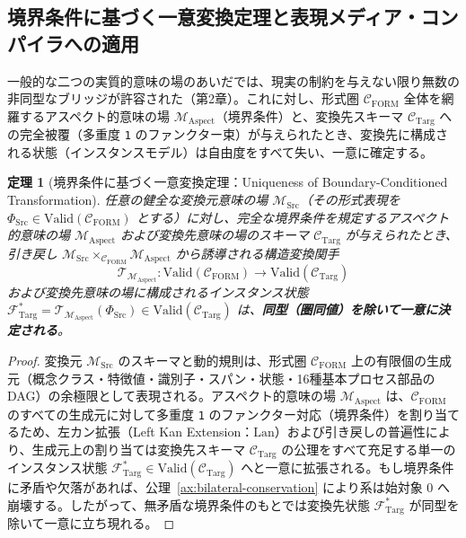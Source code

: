 \documentclass[11pt,a4paper]{ltjsarticle}
\theoremstyle{definition}
\theoremstyle{plain}
\newtheorem{theorem}{定理}[section]
\theoremstyle{remark}
\newcommand{\Valid}{\mathrm{Valid}}
\newcommand{\CFORM}{\mathcal{C}_{\mathrm{FORM}}}
\newcommand{\CTarg}{\mathcal{C}_{\mathrm{Targ}}}
\newcommand{\MSrc}{\mathcal{M}_{\mathrm{Src}}}
\newcommand{\MAspect}{\mathcal{M}_{\mathrm{Aspect}}}
\begin{document}
\subsection{境界条件に基づく一意変換定理と表現メディア・コンパイラへの適用}
一般的な二つの実質的意味の場のあいだでは、現実の制約を与えない限り無数の非同型なブリッジが許容された（第2章）。これに対し、形式圏 $\CFORM$ 全体を網羅するアスペクト的意味の場 $\MAspect$（境界条件）と、変換先スキーマ $\CTarg$ への完全被覆（多重度 \texttt{1} のファンクター束）が与えられたとき、変換先に構成される状態（インスタンスモデル）は自由度をすべて失い、一意に確定する。

\begin{theorem}[境界条件に基づく一意変換定理：Uniqueness of Boundary-Conditioned Transformation]\label{thm:unique-transformation}
任意の健全な変換元意味の場 $\MSrc$（その形式表現を $\Phi_{\mathrm{Src}} \in \Valid(\CFORM)$ とする）に対し、完全な境界条件を規定するアスペクト的意味の場 $\MAspect$ および変換先意味の場のスキーマ $\CTarg$ が与えられたとき、引き戻し $\MSrc \times_{\CFORM} \MAspect$ から誘導される構造変換関手
\begin{equation}
\mathcal{T}_{\MAspect} : \Valid(\CFORM) \longrightarrow \Valid(\CTarg)
\end{equation}
および変換先意味の場に構成されるインスタンス状態 $\mathcal{F}_{\mathrm{Targ}}^* = \mathcal{T}_{\MAspect}(\Phi_{\mathrm{Src}}) \in \Valid(\CTarg)$ は、\textbf{同型（圏同値）を除いて一意に決定される}。
\end{theorem}

\begin{proof}
変換元 $\MSrc$ のスキーマと動的規則は、形式圏 $\CFORM$ 上の有限個の生成元（概念クラス・特徴値・識別子・スパン・状態・16種基本プロセス部品の DAG）の余極限として表現される。アスペクト的意味の場 $\MAspect$ は、$\CFORM$ のすべての生成元に対して多重度 \texttt{1} のファンクター対応（境界条件）を割り当てるため、左カン拡張（Left Kan Extension：$\mathrm{Lan}$）および引き戻しの普遍性により、生成元上の割り当ては変換先スキーマ $\CTarg$ の公理をすべて充足する単一のインスタンス状態 $\mathcal{F}_{\mathrm{Targ}}^* \in \Valid(\CTarg)$ へと一意に拡張される。もし境界条件に矛盾や欠落があれば、公理~\ref{ax:bilateral-conservation} により系は始対象 $0$ へ崩壊する。したがって、無矛盾な境界条件のもとでは変換先状態 $\mathcal{F}_{\mathrm{Targ}}^*$ が同型を除いて一意に立ち現れる。
\end{proof}
\end{document}
